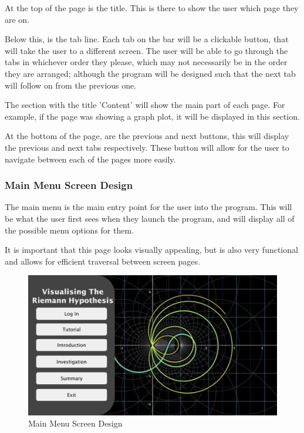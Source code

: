 \documentclass[12pt]{article}
\begin{document}
At the top of the page is the title. This is there to show the user which page they are on.

Below this, is the tab line. Each tab on the bar  will be a clickable button, that will take the user to a different screen. The user will be able to go through the tabs in whichever order they please, which may not necessarily be in the order they are arranged; although the program will be designed such that the next tab will follow on from the previous one.

The section with the title 'Content' will show the main part of each page. For example, if the page was showing a graph plot, it will be displayed in this section.

At the bottom of the page, are the previous and next buttons, this will display the previous and next tabs respectively. These button will allow for the user to navigate between each of the pages more easily.

\clearpage
\subsubsection{Main Menu Screen Design}

The main menu is the main entry point for the user into the program. This will be what the user first sees when they launch the program, and will display all of the possible menu options for them.

It is important that this page looks visually appealing, but is also very functional and allows for efficient traversal between screen pages.

\begin{figure}[ht]
    \centering
    \includegraphics[scale=0.2]{main-menu-screen-design}
    \caption{Main Menu Screen Design}
\end{figure}
\end{document}
